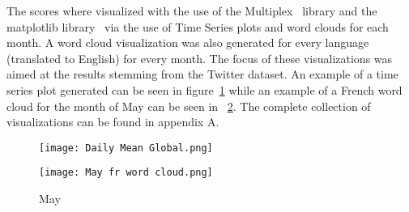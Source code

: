 The  scores where visualized with the use of the Multiplex~\citep{Mamo2021} library and the matplotlib library~\citep{Hunter:2007} via the use of Time Series plots and word clouds for each month.
A word cloud visualization was also generated for every language (translated to English) for every month.
The focus of these visualizations was aimed at the results stemming from the Twitter dataset.
An example of a time series plot generated can be seen in figure~\ref{fig:globalmean} while an example of a French word cloud for the month of May can be seen in ~\ref{fig:frmay}.
The complete collection of visualizations can be found in appendix A\@.

\begin{figure}[h!]
    \centering
    \texttt{[image: Daily Mean Global.png]}
    \caption[Daily Mean Global]{ }
    \label{fig:globalmean}
\end{figure}

%
%

\begin{figure}[h!]
    \centering
    \texttt{[image: May fr word cloud.png]}
    \caption[French Word cloud for May]{May}\label{fig:frmay}
\end{figure}
